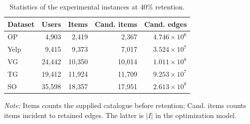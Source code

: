 \begin{table}[t]
\centering
\caption{Statistics of the experimental instances at 40\% retention.}
\label{tab:T02_instances_single_column}
\small
\setlength{\tabcolsep}{2.5pt}
\begin{tabular*}{\linewidth}{@{\extracolsep{\fill}}lrrrr@{}}
\toprule
Dataset & Users & Items & Cand. items & Cand. edges \\
\midrule
OP & 4,903 & 2,419 & 2,367 & $4.746\times10^{6}$ \\
Yelp & 9,415 & 9,373 & 7,017 & $3.524\times10^{7}$ \\
VG & 24,442 & 10,350 & 10,014 & $1.011\times10^{8}$ \\
TG & 19,412 & 11,924 & 11,709 & $9.253\times10^{7}$ \\
SO & 35,598 & 18,357 & 17,951 & $2.613\times10^{8}$ \\
\bottomrule
\end{tabular*}
\par\smallskip
\begin{minipage}{.98\linewidth}\footnotesize
\textit{Note:} Items counts the supplied catalogue before retention; Cand. items counts items incident to retained edges. The latter is $|I|$ in the optimization model.
\end{minipage}
\end{table}
